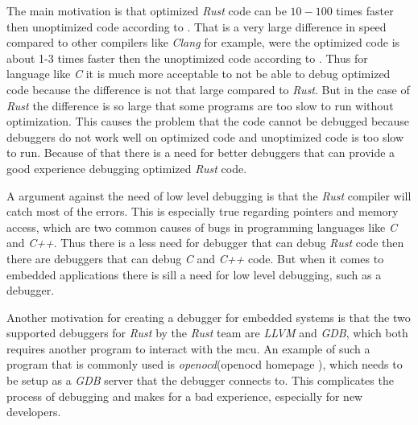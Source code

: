


The main motivation is that optimized \emph{Rust} code can be $10-100$ times faster then unoptimized code according to \cite{perf-book}.
That is a very large difference in speed compared to other compilers like \emph{Clang} for example, were the optimized code is about 1-3 times faster then the unoptimized code according to \cite{clang-opt}.
Thus for language like \emph{C} it is much more acceptable to not be able to debug optimized code because the difference is not that large compared to \emph{Rust}.
But in the case of \emph{Rust} the difference is so large that some programs are too slow to run without optimization.
This causes the problem that the code cannot be debugged because debuggers do not work well on optimized code and unoptimized code is too slow to run.
Because of that there is a need for better debuggers that can provide a good experience debugging optimized \emph{Rust} code.


A argument against the need of low level debugging is that the \emph{Rust} compiler will catch most of the errors.
This is especially true regarding pointers and memory access, which are two common causes of bugs in programming languages like \emph{C} and \emph{C++}. 
Thus there is a less need for debugger that can debug \emph{Rust} code then there are debuggers that can debug \emph{C} and \emph{C++} code.
But when it comes to embedded applications there is sill a need for low level debugging, such as a debugger.


Another motivation for creating a debugger for embedded systems is that the two supported debuggers for \emph{Rust} by the \emph{Rust} team are \emph{LLVM} and \emph{GDB}, which both requires another program to interact with the \gls{mcu}.
An example of such a program that is commonly used is \emph{openocd}(openocd homepage \cite{openocd}), which needs to be setup as a \emph{GDB} server that the debugger connects to.
This complicates the process of debugging and makes for a bad experience, especially for new developers.


